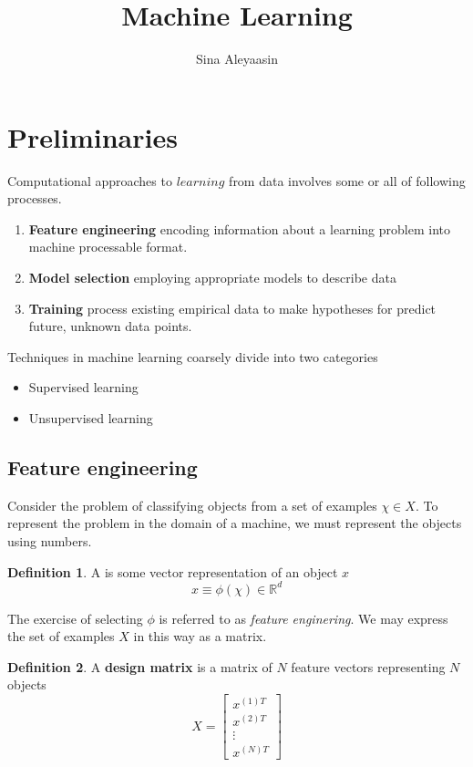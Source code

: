 \documentclass{article}
\title{Machine Learning}
\author{Sina Aleyaasin}
\theoremstyle{definition}
\newtheorem{definition}{Definition}[section]
\theoremstyle{remark}
\begin{document}
\maketitle
\section{Preliminaries}
Computational approaches to $learning$ from data involves some or all of following processes.
\begin{enumerate}
  \item \textbf{Feature engineering} encoding information about a learning problem into machine processable format.
  \item \textbf{Model selection} employing appropriate models to describe data
  \item \textbf{Training} process existing empirical data to make hypotheses for predict future, unknown data points.
\end{enumerate}
Techniques in machine learning coarsely divide into two categories
\begin{itemize}
  \item Supervised learning
  \item Unsupervised learning
\end{itemize}

\subsection{Feature engineering}
Consider the problem of classifying objects from a set of examples $\chi \in X$. 
To represent the problem in the domain of a machine, we must represent the objects using numbers.
\begin{definition}
A  is some vector representation of an object $x$
  \begin{equation}
    x \equiv \phi(\chi) \in \mathbb{R}^{d}
    \label{eqn:featureengineering}
  \end{equation}
\end{definition}
The exercise of selecting $\phi$ is referred to as \textit{feature enginering}.
We may express the set of examples $X$ in this way as a matrix.
\begin{definition}
A \textbf{design matrix} is a matrix of $N$ feature vectors representing $N$ objects 
    \begin{equation}
    X = \begin{bmatrix}
        x^{(1)T} \\
        x^{(2)T} \\
        \vdots \\
        x^{(N)T}
    \end{bmatrix}
    \end{equation}
\end{definition} 
\end{document}
